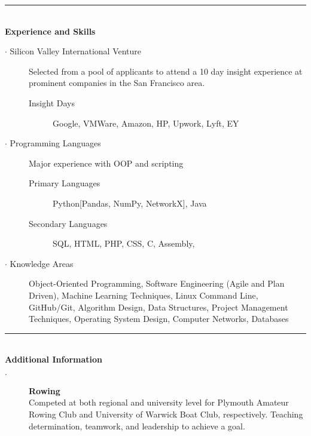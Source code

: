 \documentclass[12pt, a4paper]{article}
\begin{document}
\vspace{-2ex}
\noindent\rule{8cm}{0.4pt} \\
\textbf{Experience and Skills}
  \begin{description}
    \item[$\cdot$ Silicon Valley International Venture] Selected from a pool of applicants to attend a 10 day insight experience at prominent companies in the San Francisco area.
    \begin{description}
      \item[Insight Days] Google, VMWare, Amazon, HP, Upwork, Lyft, EY
    \end{description}
    \item[$\cdot$ Programming Languages] Major experience with OOP and scripting
    \begin{description}
      \item[Primary Languages] Python[Pandas, NumPy, NetworkX], Java
      \item[Secondary Languages] SQL, HTML, PHP, CSS, C, Assembly,
    \end{description}
    \item[$\cdot$ Knowledge Areas] Object-Oriented Programming, 
		Software Engineering (Agile and Plan Driven), 
		  Machine Learning Techniques, 
		  Linux Command Line,
      GitHub/Git, 
		  Algorithm Design, 
		  Data Structures,
      Project Management Techniques, 
		  Operating System Design, 
		  Computer Networks, 
		  Databases
  \end{description}

\vspace{-2ex}
\noindent\rule{8cm}{0.4pt} \\

\textbf{Additional Information}
  \begin{description}
    \item[$\cdot$] \textbf{Rowing} \\Competed at both regional and university level for Plymouth Amateur Rowing Club and University of Warwick Boat Club, respectively. Teaching determination, teamwork, and leadership to achieve a goal.

    \iffalse
    Rowing has taught me the value of team work, and has given me transferable skills including resilience, decision making, and precision, all of which I bring to the workplace.
    Time management $\cdot$ Team work $\cdot$ Resilience $\cdot$ Motivational skills $\cdot$ Quick thinking \\ $\cdot$ Technical planning $\cdot$ Precision
    \fi
  \end{description}
\end{document}
